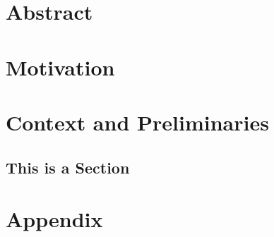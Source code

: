 \documentclass[
	11pt, 
	a4paper, 
	twoside, 
	openright, 
	titlepage=firstiscover, 
	numbers=noenddot, 
	BCOR=12mm,
	headsepline,
	footsepline,
	toc=listof,
	toc=bibliography
	]{scrbook}
\begin{document}

	
	
	
	
\cleardoublepage
{}
	
	\chapter*{Abstract}
	\Blindtext[2][2]
	
	\tableofcontents

\cleardoublepage
{} 

	\chapter{Motivation}
	\Blindtext[2][2]
	
	\chapter{Context and Preliminaries}
	\Blindtext[2][2]\cite{al-kodmany_sentient_2012}
	\section{This is a Section}
	\Blindtext[2][2]
	\begin{definition}
		\Blindtext[1][1]
	\end{definition}
	\Blindtext[1][2]
	
	
\cleardoublepage
{}
	
	\appendix
	
	\chapter{Appendix}
	\Blindtext[2][2]
	
	
	
	
	\renewcommand{\listtheoremname}{List of Definitions}
	\listoftheorems[ignoreall,show={definition}]
	\listoffigures
	\listoftables
	\renewcommand{\lstlistlistingname}{List of \lstlistingname s}
	\lstlistoflistings	
	\renewcommand{\listtheoremname}{List of Formulas}
	\listoftheorems[ignoreall,show={formula}]
	\printbibliography %
\end{document}
